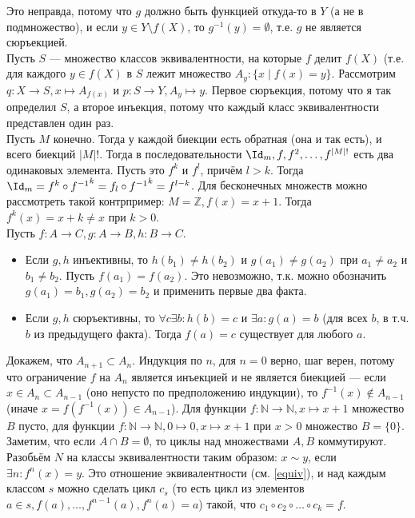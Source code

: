 \documentclass[12pt,a4paper]{article}
\begin{document}
\n Это неправда, потому что $g$ должно быть функцией откуда-то в $Y$ (а не в подмножество), и если $y\in Y\setminus f(X)$, то $g^{-1}(y)=\emptyset$, т.е. $g$ не является сюръекцией.\QEDA\\

\p Пусть $S$ --- множество классов эквивалентности, на которые $f$ делит $f(X)$ (т.е. для каждого $y\in f(X)$ в $S$ лежит множество $A_y:\{x\mid f(x)=y\}$. Рассмотрим $q:X\to S,x\mapsto A_{f(x)}$ и $p:S\to Y,A_y\mapsto y$. Первое сюръекция, потому что я так определил $S$, а второе инъекция, потому что каждый класс эквивалентности представлен один раз.\label{equiv}\QEDA\\

\z Пусть $M$ конечно. Тогда у каждой биекции есть обратная (она и так есть), и всего биекций $|M|!$. Тогда в последовательности $\Id_m,f,f^2,\ldots ,f^{|M|!}$ есть два одинаковых элемента. Пусть это $f^k$ и $f^l$, причём $l>k$. Тогда $\Id_m=f^k\circ {f^{-1}}^k=f_l\circ {f^{-1}}^k=f^{l-k}$. Для бесконечных множеств можно рассмотреть такой контрпример: $M=\mathbb Z,f(x)=x+1$. Тогда $f^k(x)=x+k\neq x$ при $k>0$.\QEDA\\

\n Пусть $f:A\to C,g:A\to B,h:B\to C$.

\begin{itemize}
	\item Если $g,h$ инъективны, то $h(b_1)\neq h(b_2)$ и $g(a_1)\neq g(a_2)$ при $a_1\neq a_2$ и $b_1\neq b_2$. Пусть $f(a_1)=f(a_2)$. Это невозможно, т.к. можно обозначить $g(a_1)=b_1,g(a_2)=b_2$ и применить первые два факта.
	\item Если $g,h$ сюръективны, то $\forall c\exists b:h(b)=c$ и $\exists a:g(a)=b$ (для всех $b$, в т.ч. $b$ из предыдущего факта). Тогда $f(a)=c$ существует для любого $a$.\QEDA\\
\end{itemize}

\n Докажем, что $A_{n+1}\subset A_n$. Индукция по $n$, для $n=0$ верно, шаг верен, потому что ограничение $f$ на $A_n$ является инъекцией и не является биекцией --- если $x\in A_n\subset A_{n-1}$ (оно непусто по предположению индукции), то $f^{-1}(x)\notin A_{n-1}$ (иначе $x=f(f^{-1}(x))\in A_{n-1}$). Для функции $f:\mathbb N\to \mathbb N,x\mapsto x+1$ множество $B$ пусто, для функции $f:\mathbb N\to \mathbb N,0\mapsto 0,x\mapsto x+1$ при $x>0$ множество $B=\{0\}$.\QEDA\\

\z Заметим, что если $A\cap B=\emptyset$, то циклы над множествами $A,B$ коммутируют. Разобьём $N$ на классы эквивалентности таким образом: $x\sim y$, если $\exists n:f^n(x)=y$. Это отношение эквивалентности (см. \ref{equiv}), и над каждым классом $s$ можно сделать цикл $c_s$ (то есть цикл из элементов $a\in s,f(a),\ldots ,f^{n-1}(a),f^n(a)=a$) такой, что $c_1\circ c_2\circ \ldots \circ c_k=f$.\QEDA\\
\end{document}
